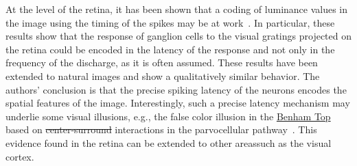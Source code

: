 \documentclass[brainsci, %
               review,accept,pdftex,moreauthors %
               ]{Definitions/mdpi}
\providecommand{\DIFadd}[1]{{\protect\color{blue}\uwave{#1}}} %
\providecommand{\DIFdel}[1]{{\protect\color{red}\sout{#1}}}                      %
\providecommand{\DIFaddbegin}{} %
\providecommand{\DIFaddend}{} %
\providecommand{\DIFdelbegin}{} %
\providecommand{\DIFdelend}{} %
\newcommand{\DIFscaledelfig}{0.5}
\newlength{\DIFdelgraphicswidth} %
\newlength{\DIFdelgraphicsheight} %
\newcommand{\DIFaddincludegraphics}[2][]{{\color{blue}\fbox{\DIFOincludegraphics[#1]{#2}}}} %
\newcommand{\DIFdelincludegraphics}[2][]{%
\sbox{\DIFdelgraphicsbox}{\DIFOincludegraphics[#1]{#2}}%
\settoboxwidth{\DIFdelgraphicswidth}{\DIFdelgraphicsbox} %
\settoboxtotalheight{\DIFdelgraphicsheight}{\DIFdelgraphicsbox} %
\scalebox{\DIFscaledelfig}{%
\parbox[b]{\DIFdelgraphicswidth}{\usebox{\DIFdelgraphicsbox}\\[-\baselineskip] \rule{\DIFdelgraphicswidth}{0em}}\llap{\resizebox{\DIFdelgraphicswidth}{\DIFdelgraphicsheight}{%
\setlength{\unitlength}{\DIFdelgraphicswidth}%
\begin{picture}(1,1)%
\thicklines\linethickness{2pt} %
{\color[rgb]{1,0,0}\put(0,0){\framebox(1,1){}}}%
{\color[rgb]{1,0,0}\put(0,0){\line( 1,1){1}}}%
{\color[rgb]{1,0,0}\put(0,1){\line(1,-1){1}}}%
\end{picture}%
}\hspace*{3pt}}} %
} %
\DeclareRobustCommand{\DIFaddbegin}{\DIFOaddbegin \let\includegraphics\DIFaddincludegraphics} %
\DeclareRobustCommand{\DIFaddend}{\DIFOaddend \let\includegraphics\DIFOincludegraphics} %
\DeclareRobustCommand{\DIFdelbegin}{\DIFOdelbegin \let\includegraphics\DIFdelincludegraphics} %
\DeclareRobustCommand{\DIFdelend}{\DIFOaddend \let\includegraphics\DIFOincludegraphics} %
\begin{document}
 At the level of the retina, it has been shown that a coding of luminance values in the image using the timing of the spikes may be at work~\citep{gollisch_rapid_2008}. In particular, these results show that the response of ganglion cells to the visual gratings projected on the retina could be encoded in the latency of the response and not only in the frequency of the discharge, as it is often assumed. These results have been extended to natural images and show a qualitatively similar behavior. The authors' conclusion is that the precise spiking latency of the neurons encodes the spatial features of the image. Interestingly, such a precise latency mechanism may underlie some visual illusions, e.g., the false color illusion in the \href{https://michaelbach.de/ot/col-Benham/index.html}{Benham Top} based on \DIFdelbegin \DIFdel{center-surround }\DIFdelend \DIFaddbegin \DIFadd{center--surround }\DIFaddend interactions in the parvocellular pathway~\citep{kenyon_theory_2004}. This evidence found in the retina can be extended to other areas\DIFaddbegin \DIFadd{, }\DIFaddend such as the visual cortex.

\DIFaddbegin 
\end{document}
